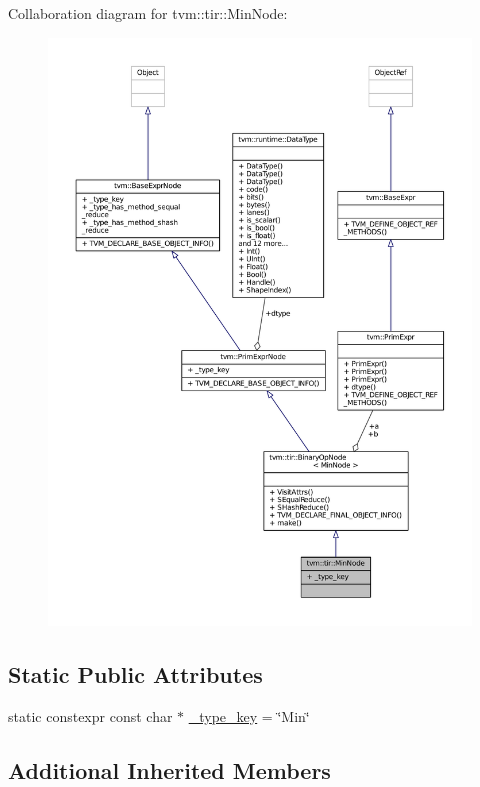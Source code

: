Collaboration diagram for tvm\+:\+:tir\+:\+:Min\+Node\+:
\nopagebreak
\begin{figure}[H]
\begin{center}
\leavevmode
\includegraphics[width=350pt]{classtvm_1_1tir_1_1MinNode__coll__graph}
\end{center}
\end{figure}
\subsection*{Static Public Attributes}
\begin{DoxyCompactItemize}
\item 
static constexpr const char $\ast$ \hyperlink{classtvm_1_1tir_1_1MinNode_a5359dfe036d6b7131689e59a7e5cd641}{\+\_\+type\+\_\+key} = \char`\"{}Min\char`\"{}
\end{DoxyCompactItemize}
\subsection*{Additional Inherited Members}


